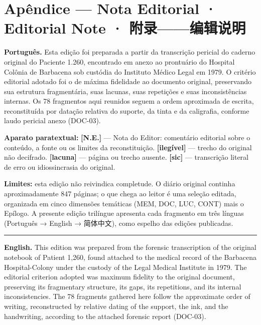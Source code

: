 \cleardoublepage
\thispagestyle{empty}
\chapter*{Apêndice --- Nota Editorial · Editorial Note · 附录——编辑说明}

\begingroup

\noindent\textbf{Português.} Esta edição foi preparada a partir da transcrição pericial do caderno original do Paciente 1.260, encontrado em anexo ao prontuário do Hospital Colônia de Barbacena sob custódia do Instituto Médico Legal em 1979. O critério editorial adotado foi o de máxima fidelidade ao documento original, preservando sua estrutura fragmentária, suas lacunas, suas repetições e suas inconsistências internas. Os 78 fragmentos aqui reunidos seguem a ordem aproximada de escrita, reconstituída por datação relativa do suporte, da tinta e da caligrafia, conforme laudo pericial anexo (DOC-03).

\vspace{0.4em}
\noindent\textbf{Aparato paratextual:} \textbf{[N.E.]} --- Nota do Editor: comentário editorial sobre o conteúdo, a fonte ou os limites da reconstituição. \textbf{[ilegível]} --- trecho do original não decifrado. \textbf{[lacuna]} --- página ou trecho ausente. \textbf{[sic]} --- transcrição literal de erro ou idiossincrasia do original.

\vspace{0.4em}
\noindent\textbf{Limites:} esta edição não reivindica completude. O diário original continha aproximadamente 847 páginas; o que chega ao leitor é uma seleção editada, organizada em cinco dimensões temáticas (MEM, DOC, LUC, CONT) mais o Epílogo. A presente edição trilíngue apresenta cada fragmento em três línguas (Português → English → 简体中文), como espelho das edições publicadas.

\vspace{1em}
\noindent\rule{\textwidth}{0.5pt}
\vspace{0.8em}

\noindent\textbf{English.} This edition was prepared from the forensic transcription of the original notebook of Patient 1,260, found attached to the medical record of the Barbacena Hospital-Colony under the custody of the Legal Medical Institute in 1979. The editorial criterion adopted was maximum fidelity to the original document, preserving its fragmentary structure, its gaps, its repetitions, and its internal inconsistencies. The 78 fragments gathered here follow the approximate order of writing, reconstructed by relative dating of the support, the ink, and the handwriting, according to the attached forensic report (DOC-03).

